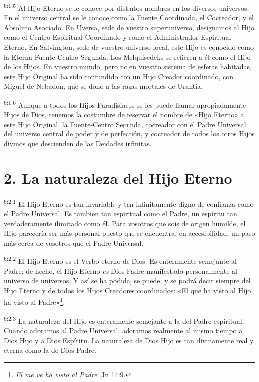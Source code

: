 \par
\textsuperscript{6:1.5} Al Hijo Eterno se le conoce por distintos nombres en los diversos universos. En el universo central se le conoce como la Fuente Coordinada, el Cocreador, y el Absoluto Asociado. En Uversa, sede de vuestro superuniverso, designamos al Hijo como el Centro Espiritual Coordinado y como el Administrador Espiritual Eterno. En Salvington, sede de vuestro universo local, este Hijo es conocido como la Eterna Fuente-Centro Segunda. Los Melquisedeks se refieren a él como el Hijo de los Hijos. En vuestro mundo, pero no en vuestro sistema de esferas habitadas, este Hijo Original ha sido confundido con un Hijo Creador coordinado, con Miguel de Nebadon, que se donó a las razas mortales de Urantia.

\par
\textsuperscript{6:1.6} Aunque a todos los Hijos Paradisiacos se les puede llamar apropiadamente Hijos de Dios, tenemos la costumbre de reservar el nombre de «Hijo Eterno» a este Hijo Original, la Fuente-Centro Segunda, cocreador con el Padre Universal del universo central de poder y de perfección, y cocreador de todos los otros Hijos divinos que descienden de las Deidades infinitas.

\section*{2. La naturaleza del Hijo Eterno}
\par
\textsuperscript{6:2.1} El Hijo Eterno es tan invariable y tan infinitamente digno de confianza como el Padre Universal. Es también tan espiritual como el Padre, un espíritu tan verdaderamente ilimitado como él. Para vosotros que sois de origen humilde, el Hijo parecería ser más personal puesto que se encuentra, en accesibilidad, un paso más cerca de vosotros que el Padre Universal.

\par
\textsuperscript{6:2.2} El Hijo Eterno es el Verbo eterno de Dios. Es enteramente semejante al Padre; de hecho, el Hijo Eterno \textit{es} Dios Padre manifestado personalmente al universo de universos. Y así se ha podido, se puede, y se podrá decir siempre del Hijo Eterno y de todos los Hijos Creadores coordinados: «El que ha visto al Hijo, ha visto al Padre»\footnote{\textit{El me ve ha visto al Padre}: Jn 14:9.}.

\par
\textsuperscript{6:2.3} La naturaleza del Hijo es enteramente semejante a la del Padre espiritual. Cuando adoramos al Padre Universal, adoramos realmente al mismo tiempo a Dios Hijo y a Dios Espíritu. La naturaleza de Dios Hijo es tan divinamente real y eterna como la de Dios Padre.

